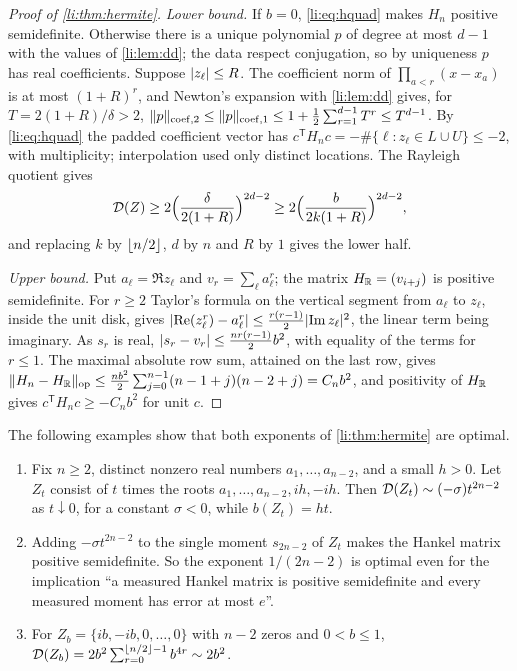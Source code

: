 \begin{proof}[Proof of \cref{li:thm:hermite}]
\emph{Lower bound.} If $b=0$, \eqref{li:eq:hquad} makes $H_n$ positive semidefinite. Otherwise
there is a unique polynomial $p$ of degree at most $d-1$ with the values of \cref{li:lem:dd}; the
data respect conjugation, so by uniqueness $p$ has real coefficients. Suppose $\lvert z_\ell\rvert\le R$.
The coefficient norm of $\prod_{a<r}(x-x_a)$ is at most $(1+R)^r$, and Newton's expansion with
\cref{li:lem:dd} gives, for $T=2(1+R)/\delta>2$,
$\lVert p\rVert_{\mathrm{coef},2}\le\lVert p\rVert_{\mathrm{coef},1}\le1+\frac12\sum_{r=1}^{d-1}T^r\le T^{d-1}$.
By \eqref{li:eq:hquad} the padded coefficient vector has
$c^{\mathsf T}H_nc=-\#\{\ell:z_\ell\in L\cup U\}\le-2$, with multiplicity; interpolation used only
distinct locations. The Rayleigh quotient gives
\begin{equation}\label{li:eq:hradius}
 \mathcal{D}(Z)\ge2\Bigl(\frac\delta{2(1+R)}\Bigr)^{2d-2}\ge2\Bigl(\frac b{2k(1+R)}\Bigr)^{2d-2},
\end{equation}
and replacing $k$ by $\lfloor n/2\rfloor$, $d$ by $n$ and $R$ by $1$ gives the lower half.

\emph{Upper bound.} Put $a_\ell=\Re z_\ell$ and $v_r=\sum_\ell a_\ell^r$; the matrix $H_{\mathbb{R}}=(v_{i+j})$ is
positive semidefinite. For $r\ge2$ Taylor's formula on the vertical segment from $a_\ell$ to $z_\ell$,
inside the unit disk, gives $\lvert\operatorname{Re}(z_\ell^r)-a_\ell^r\rvert\le\frac{r(r-1)}2\lvert\operatorname{Im} z_\ell\rvert^2$, the linear
term being imaginary. As $s_r$ is real, $\lvert s_r-v_r\rvert\le\frac{nr(r-1)}2b^2$, with equality of the
terms for $r\le1$. The maximal absolute row sum, attained on the last row, gives
$\lVert H_n-H_{\mathbb{R}}\rVert_{\mathrm{op}}\le\frac{nb^2}2\sum_{j=0}^{n-1}(n-1+j)(n-2+j)=C_nb^2$, and positivity of
$H_{\mathbb{R}}$ gives $c^{\mathsf T}H_nc\ge-C_nb^2$ for unit $c$.
\end{proof}

\begin{proposition}\label{li:prop:hsharp}
The following examples show that both exponents of \cref{li:thm:hermite} are optimal.
\begin{enumerate}[label=\textup{(\roman*)}]
\item Fix $n\ge2$, distinct nonzero real numbers $a_1,\dots,a_{n-2}$, and a small $h>0$.
 Let $Z_t$ consist of $t$ times the roots $a_1,\dots,a_{n-2},ih,-ih$. Then $\mathcal{D}(Z_t)\sim(-\sigma)t^{2n-2}$ as
 $t\downarrow0$, for a constant $\sigma<0$, while $b(Z_t)=ht$.
\item Adding $-\sigma t^{2n-2}$ to the single moment $s_{2n-2}$ of $Z_t$ makes the Hankel matrix
 positive semidefinite. So the exponent $1/(2n-2)$ is optimal even for the implication ``a measured
 Hankel matrix is positive semidefinite and every measured moment has error at most $e$''.
\item For $Z_b=\{ib,-ib,0,\dots,0\}$ with $n-2$ zeros and $0<b\le1$,
 $\mathcal{D}(Z_b)=2b^2\sum_{r=0}^{\lfloor n/2\rfloor-1}b^{4r}\sim2b^2$.
\end{enumerate}
\end{proposition}

